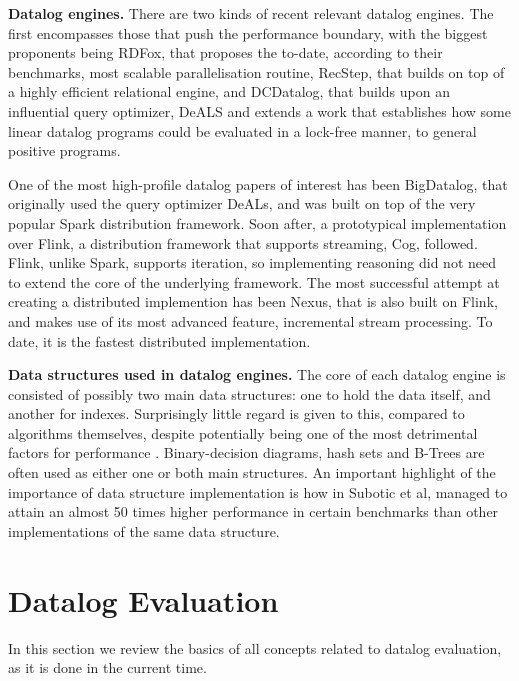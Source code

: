 \textbf{Datalog engines.} There are two kinds of recent relevant datalog engines. The first encompasses
those that push the performance boundary, with the biggest proponents being RDFox\cite{rdfox}, that
proposes the to-date, according to their benchmarks, most scalable parallelisation routine, RecStep\cite{recstep},
that builds on top of a highly efficient relational engine, and DCDatalog\cite{dcdatalog}, that builds upon
an influential query optimizer, DeALS\cite{deals} and extends a work that establishes how some linear
datalog programs could be evaluated in a lock-free manner, to general positive programs.

One of the most high-profile datalog papers of interest has been BigDatalog\cite{bigdatalog}, that
originally used the query optimizer DeALs, and was built on top of the very popular Spark\cite{spark}
distribution framework. Soon after, a prototypical implementation\cite{cog} over Flink\cite{flink},
a distribution framework that supports streaming, Cog, followed. Flink, unlike Spark, supports
iteration, so implementing reasoning did not need to extend the core of the underlying framework. The most
successful attempt at creating a distributed implemention has been Nexus\cite{nexus}, that is also built on Flink,
and makes use of its most advanced feature, incremental stream processing. To date, it is the fastest distributed
implementation.

\textbf{Data structures used in datalog engines.} The core of each datalog engine is consisted of possibly
two main data structures: one to hold the data itself, and another for indexes. Surprisingly little regard is given to
this, compared to algorithms themselves, despite potentially being one of the most detrimental factors for performance
. Binary-decision diagrams\cite{bddbddb}, hash sets\cite{microzee} and B-Trees\cite{souffle_btree} are often used as
either one or both main structures. An important highlight of the importance of data structure implementation is how
in \cite{souffle_btree} Subotic et al, managed to attain an almost 50 times higher performance in certain benchmarks
than other implementations of the same data structure.

\section{Datalog Evaluation}

In this section we review the basics of all concepts related to datalog evaluation, as it is done in the current time.

